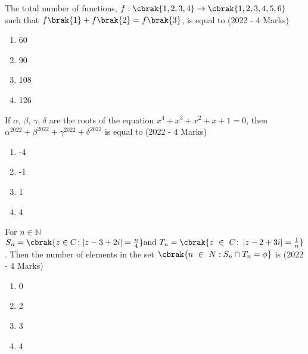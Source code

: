 \iffalse
\title{Assignment 1}
\author{Siddhanth Yellanki - ee24btech11059}
\section{mcq-single}
\fi

    \item{
          	The total number of functions, $f : \cbrak{1, 2, 3, 4} \to \cbrak{1, 2, 3, 4, 5, 6}$ such that $f\brak{1} + f\brak{2} = f\brak{3}$, is equal to \text{  }\hfill
                {(2022 - 4 Marks)}
                \begin{multicols}{4}
					\begin{enumerate}
						\item 60
						\item 90
						\item 108
						\item 126
					\end{enumerate}
				\end{multicols}
            }
    \item{
           	If $\alpha$, $\beta$, $\gamma$, $\delta$ are the roots of the equation $x^4 + x^3 + x^2 + x + 1 = 0$, then $\alpha^{2022} + \beta^{2022} + \gamma^{2022} + \delta^{2022}$ is equal to
           	\hfill
           	{(2022 - 4 Marks)}
                \begin{multicols}{4}
                	\begin{enumerate}
                		\item -4
                		\item -1
                		\item 1
                		\item 4
                	\end{enumerate}
                \end{multicols}
        }
\item{
        	
        	For $n \in \mathbb{N}$  $S_n=\cbrak{z\in C\colon |z-3+2i|=\frac{n}{4} } \text{and}~ T_n=\cbrak{ z\ \in\ C \colon \left|z-2+3i\right|=\frac{1}{n}}$. Then the number of elements in the set $ \cbrak{n\ \in\ N: S_n\cap T_n=\phi}$ is
        	\hfill
        	{(2022 - 4 Marks)}
        	\begin{multicols}{4}
        		\begin{enumerate}
        			\item 0
        			\item 2
        			\item 3
        			\item 4
        		\end{enumerate}
        	\end{multicols}
        	
        }
